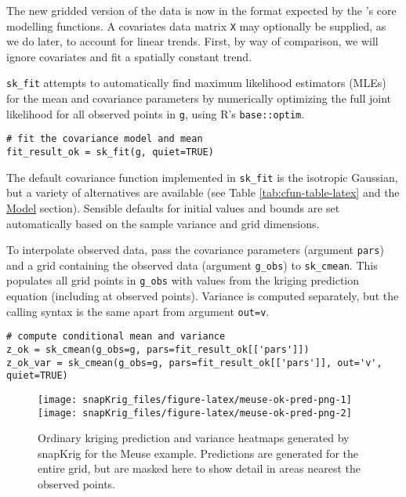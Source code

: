 The new gridded version of the data is now in the format expected by the 's core modelling functions. A covariates data matrix \texttt{X} may optionally be supplied, as we do later, to account for linear trends. First, by way of comparison, we will ignore covariates and fit a spatially constant trend.

\texttt{sk\_fit} attempts to automatically find maximum likelihood estimators (MLEs) for the mean and covariance parameters by numerically optimizing the full joint likelihood for all observed points in \texttt{g}, using R's \texttt{base::optim}.

\begin{verbatim}
# fit the covariance model and mean
fit_result_ok = sk_fit(g, quiet=TRUE)
\end{verbatim}

The default covariance function implemented in \texttt{sk\_fit} is the isotropic Gaussian, but a variety of alternatives are available
(see Table \ref{tab:cfun-table-latex} and the \protect\hyperlink{model}{Model} section). Sensible defaults for initial values and bounds are set automatically based on the sample variance and grid dimensions.

To interpolate observed data, pass the covariance parameters (argument \texttt{pars}) and a grid containing the observed data (argument \texttt{g\_obs}) to \texttt{sk\_cmean}. This populates all grid points in \texttt{g\_obs} with values from the kriging prediction equation (including at observed points). Variance is computed separately, but the calling syntax is the same apart from argument \texttt{out=\textquotesingle{}v\textquotesingle{}}.

\begin{verbatim}
# compute conditional mean and variance 
z_ok = sk_cmean(g_obs=g, pars=fit_result_ok[['pars']])
z_ok_var = sk_cmean(g_obs=g, pars=fit_result_ok[['pars']], out='v', quiet=TRUE)
\end{verbatim}

\begin{figure}
\texttt{[image: snapKrig\_files/figure-latex/meuse-ok-pred-png-1]} \texttt{[image: snapKrig\_files/figure-latex/meuse-ok-pred-png-2]} \caption{Ordinary kriging prediction and variance heatmaps generated by snapKrig for the Meuse example. Predictions are generated for the entire grid, but are masked here to show detail in areas nearest the observed points.}\label{fig:meuse-ok-pred-png}
\end{figure}

